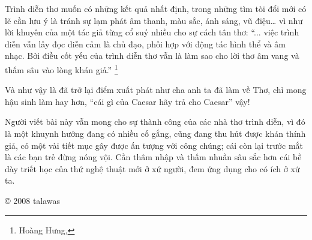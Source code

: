 \documentclass[../main.tex]{subfiles}
\begin{document}
\begin{multicols}{2}
Trình diễn thơ muốn có những kết quả nhất định, trong những tìm tòi đổi mới có lẽ cần lưu ý là tránh sự lạm phát âm thanh, màu sắc, ánh sáng, vũ điệu… vì như lời khuyên của một tác giả từng cổ suý nhiều cho sự cách tân thơ: “... việc trình diễn vẫn lấy đọc diễn cảm là chủ đạo, phối hợp với động tác hình thể và âm nhạc. Bởi điều cốt yếu của trình diễn thơ vẫn là làm sao cho lời thơ âm vang và thấm sâu vào lòng khán giả.” \footnote{
Hoàng Hưng,}  
  
Và như vậy là đã trở lại điểm xuất phát như cha anh ta  đã  làm về Thơ, chỉ mong hậu sinh làm hay hơn, “cái gì của Caesar hãy trả cho Caesar” vậy! 
 
Người viết bài này vẫn mong cho sự thành công của các nhà thơ trình diễn, vì đó là một khuynh hướng đang có nhiều cố gắng, cũng đang thu hút được khán thính giả, có một vài tiết mục gây được ấn tượng với công chúng; cái còn lại trước mắt là các bạn trẻ đừng nóng vội. Cần thâm nhập và thấm nhuần sâu sắc hơn cái bề dày triết học của thứ nghệ thuật mới ở xứ người, đem ứng dụng cho có ích ở xứ ta. 
 
© 2008 talawas



\end{multicols}
\end{document}
